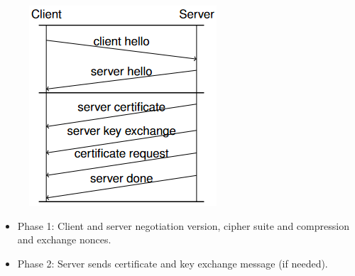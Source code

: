 \documentclass{article}
\begin{document}
\noindent\begin{minipage}{0.54\textwidth}%
\begin{figure}[H]
\begin{center}
\includegraphics[scale=0.7]{Images/tlshandshakephase12.png}
\label{fig:fround}
\end{center}
\end{figure}
\end{minipage}%
\hfill%
\begin{minipage}{0.42\textwidth}
\begin{itemize}
    \item Phase 1: Client and server negotiation version, cipher suite and compression and exchange nonces.
    \item Phase 2: Server sends certificate and key exchange message (if needed).
\end{itemize}
\end{minipage}
\end{document}
